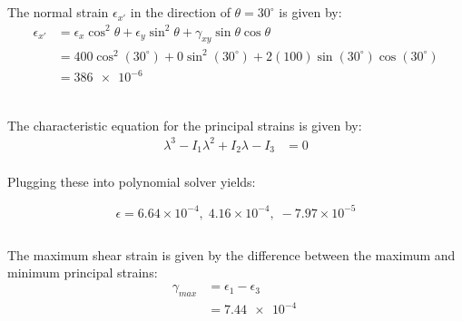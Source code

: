 \subsection{}
The normal strain $\epsilon_{x'}$ in the direction of $\theta = 30^\circ$ is given by:
\begin{align*}
    \epsilon_{x'} &= \epsilon_x\cos^2\theta + \epsilon_y\sin^2\theta + \gamma_{xy}\sin\theta\cos\theta \\
    &= 400\cos^2(30^\circ) + 0\sin^2(30^\circ) + 2(100)\sin(30^\circ)\cos(30^\circ) \\
    &= \boxed{\qty{386e-6}{}}\\
\end{align*}

\subsection{}
The characteristic equation for the principal strains is given by:
\begin{align*}
    \lambda^3 - I_1\lambda^2 + I_2\lambda - I_3 &= 0 \\
\end{align*}

Plugging these into polynomial solver yields:

\begin{equation*}
    \boxed{\epsilon = 6.64 \times 10^{-4}, \; 4.16 \times 10^{-4}, \; -7.97 \times 10^{-5}}
\end{equation*}

\subsection{}
The maximum shear strain is given by the difference between the maximum and minimum principal strains:
\begin{align*}
    \gamma_{max} &= \epsilon_1 - \epsilon_3 \\
    &= \boxed{\qty{7.44e-4}{}}
\end{align*}